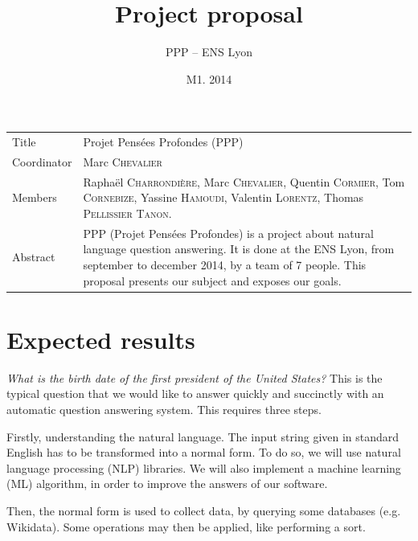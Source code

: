 \documentclass[a4paper,10pt]{article}
\title{Project proposal}
\author{PPP \--- ENS Lyon}
\date{M1. 2014}
\begin{document}
\maketitle

\newlength{\title}
\settowidth{\title}{Coordinator }

\newlength{\object}
\setlength{\object}{\textwidth} \addtolength{\object}{-\title} 
	\addtolength{\object}{-2\tabcolsep}

\renewcommand{\arraystretch}{1.5}

\begin{center}
\begin{tabular}{@{}|p{\title}p{\object}@{}|}
\hline
Title & Projet Pensées Profondes (PPP)\\
Coordinator & Marc \textsc{Chevalier}\\
Members & Raphaël \textsc{Charrondière}, Marc \textsc{Chevalier}, Quentin 
      \textsc{Cormier}, Tom \textsc{Cornebize}, \linebreak Yassine \textsc{Hamoudi}, 
      Valentin \textsc{Lorentz}, Thomas \textsc{Pellissier} \textsc{Tanon}.\\
Abstract & PPP (Projet Pensées Profondes) is a project about natural language question answering. It is done at the ENS Lyon, from september to december 2014, by a team of 7 people. This proposal presents our subject and exposes our goals.\\
\hline
\end{tabular}
\end{center}

\section{Expected results}

\emph{What is the birth date of the first president of the United States?} This is the typical question that we would like to answer quickly and succinctly with an automatic question answering system. This requires three steps. 

Firstly, understanding the natural language. The input string given in standard English has to be transformed into a normal form. To do so, we will use natural language processing (NLP) libraries. We will also implement a machine learning (ML) algorithm, in order to improve the answers of our software.

Then, the normal form is used to collect data, by querying some databases (e.g. Wikidata). Some operations may then be applied, like performing a sort.
\end{document}
